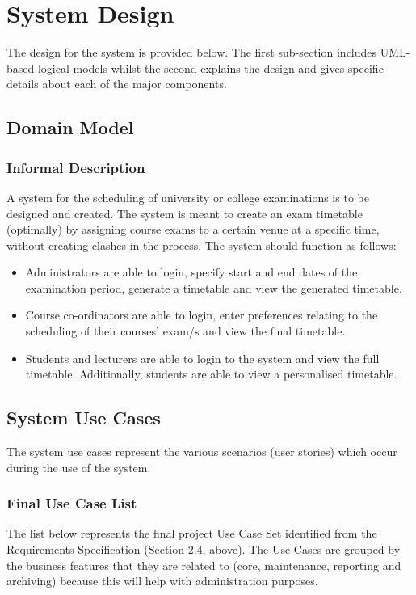 \documentclass{article}
\begin{document}
\section{System Design}
The design for the system is provided below. The first sub-section includes UML-based logical models
whilst the second explains the design and gives specific details about each of the major components.

\subsection{Domain Model}

\subsubsection{Informal Description}

A system for the scheduling of university or college examinations is to be designed and created. The system is meant to create an exam timetable (optimally) by assigning course exams to a certain venue at a specific time, without creating clashes in the process. The system should function as follows:
\begin{itemize}
  \item Administrators are able to login, specify start and end dates of the examination period, generate a timetable and view the generated timetable.
  \item Course co-ordinators are able to login, enter preferences relating to the scheduling of their courses' exam/s and view the final timetable.
  \item Students and lecturers are able to login to the system and view the full timetable. Additionally, students are able to view a personalised timetable.
\end{itemize}

\subsection{System Use Cases}
The system use cases represent the various scenarios (user stories) which occur during the use of the system.

\subsubsection{Final Use Case List}
The list below represents the final project Use Case Set identified from the Requirements Specification (Section 2.4, above). The Use Cases are grouped by the business features that they are related to (core, maintenance, reporting and archiving) because this will help with administration purposes. 
\end{document}
